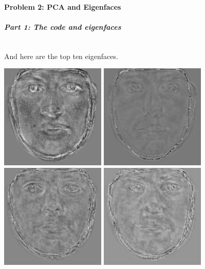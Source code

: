 \documentclass[12pt]{article}
\begin{document}
    \paragraph{Problem 2: PCA and Eigenfaces}
    \subparagraph{Part 1: The code and eigenfaces}

    \inputminted{python}{Szemis_hw2.py}

    And here are the top ten eigenfaces.
    \begin{center}
    \includegraphics[width=5cm]{output_part1/eigenface_0.png}
    \includegraphics[width=5cm]{output_part1/eigenface_1.png}
    \includegraphics[width=5cm]{output_part1/eigenface_2.png}
    \includegraphics[width=5cm]{output_part1/eigenface_3.png}

\end{center}
\end{document}
